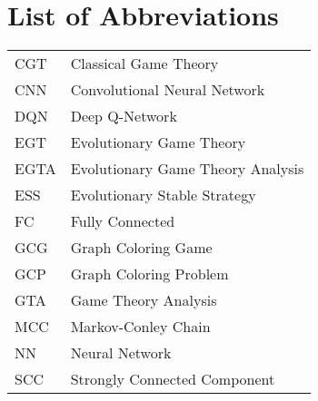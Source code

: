 \section*{List of Abbreviations}

\begin{table}[h]
    \raggedright
    \begin{tabular}{l l}
        CGT  & Classical Game Theory \\
        CNN  & Convolutional Neural Network \\
        DQN  & Deep Q-Network \\
        EGT  & Evolutionary Game Theory \\
        EGTA & Evolutionary Game Theory Analysis \\
        ESS  & Evolutionary Stable Strategy \\
        FC   & Fully Connected \\
        GCG  & Graph Coloring Game \\
        GCP  & Graph Coloring Problem \\
        GTA  & Game Theory Analysis \\
        MCC  & Markov-Conley Chain \\
        NN   & Neural Network \\
        SCC  & Strongly Connected Component \\
    \end{tabular}
\end{table}